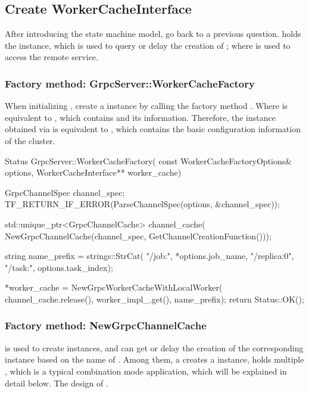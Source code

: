 \begin{content}
\subsection{Create WorkerCacheInterface}
After introducing the  state machine model, go back to a previous question.  holds the  instance, which is used to query or delay the creation of ; where  is used to access the remote  service.


\subsubsection{Factory method: GrpcServer::WorkerCacheFactory}
When initializing , create a  instance by calling the factory method . Where  is equivalent to , which contains  and its  information. Therefore, the  instance obtained via  is equivalent to , which contains the basic configuration information of the cluster.

\begin{leftbar}
\begin{c++}
Status GrpcServer::WorkerCacheFactory(
    const WorkerCacheFactoryOptions& options,
    WorkerCacheInterface** worker_cache) {

  GrpcChannelSpec channel_spec;
  TF_RETURN_IF_ERROR(ParseChannelSpec(options, &channel_spec));

  std::unique_ptr<GrpcChannelCache> channel_cache(
      NewGrpcChannelCache(channel_spec, GetChannelCreationFunction()));

  string name_prefix = strings::StrCat(
      "/job:", *options.job_name, "/replica:0",
      "/task:", options.task_index);

  *worker_cache = NewGrpcWorkerCacheWithLocalWorker(
      channel_cache.release(), worker_impl_.get(), name_prefix);
  return Status::OK();
}
\end{c++}
\end{leftbar}


\subsubsection{Factory method: NewGrpcChannelCache}
 is used to create  instances, and  can get or delay the creation of the corresponding  instance based on the name of . Among them, a  creates a  instance,  holds multiple , which is a typical combination mode application, which will be explained in detail below. The design of .


\end{content}
